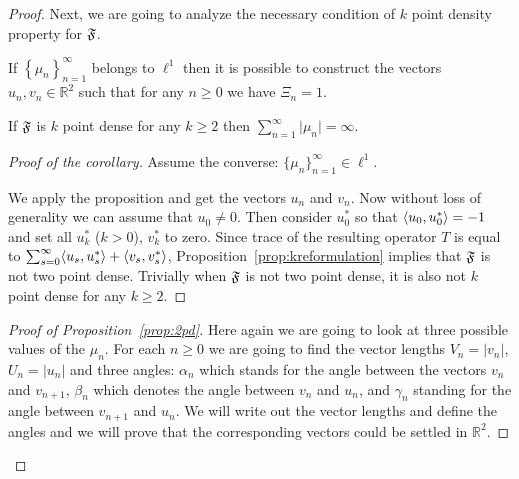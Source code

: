 \begin{proof}
      Next, we are going to analyze the necessary condition of $k$ point density property for $\mathfrak{F}$.
      \begin{prop}
        \label{prop:2pd}
        If $\left\{\mu_n\right\}_{n=1}^\infty$ belongs to $\ell^1$ then it is possible to construct
          the vectors $u_n, v_n \in \mathbb{R}^2$ such that for any $n \geq 0$ we have $\Xi_n = 1$.
      \end{prop}
      \begin{corol}
        \label{corol:2density}
        If $\mathfrak{F}$ is $k$ point dense for any $k \geq 2$ then $\sum_{n=1}^\infty \lvert\mu_n\rvert = \infty$.
      \end{corol}
      \begin{proof}[Proof of the corollary]
        Assume the converse: $\{\mu_n\}_{n=1}^\infty \in \ell^1$.

        We apply the proposition and get the vectors $u_n$ and $v_n$.
        Now without loss of generality we can assume that $u_0 \neq 0$.
        Then consider $u^*_0$ so that $\langle u_0, u^*_0 \rangle = -1$ and set all $u^*_k$ ($k > 0$), $v^*_k$ to zero.
        Since trace of the resulting operator $T$ is equal to $\sum_{s=0}^\infty \langle u_s, u^*_s \rangle + \langle v_s, v^*_s \rangle$,
          Proposition~\ref{prop:kreformulation} implies that $\mathfrak{F}$ is not two point dense.
        Trivially when $\mathfrak{F}$ is not two point dense, it is also not $k$ point dense for any $k \geq 2$.
      \end{proof}
      \begin{proof}[Proof of Proposition~\ref{prop:2pd}]
        Here again we are going to look at three possible values of the $\mu_n$.
        For each $n \geq 0$ we are going to find the vector lengths $V_n = |v_n|$, $U_n = |u_n|$ and three angles:
          $\alpha_n$ which stands for the angle between the vectors $v_n$ and $v_{n + 1}$,
          $\beta_n$ which denotes the angle between $v_n$ and $u_n$,
          and $\gamma_n$ standing for the angle between $v_{n + 1}$ and $u_n$.
        We will write out the vector lengths and define the angles and we will prove that the corresponding vectors could be settled in $\mathbb{R}^2$.


\end{proof}
\end{proof}
